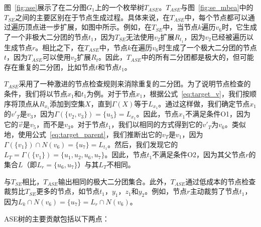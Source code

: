 \begin{example}
  图~\ref{fig:ase}展示了在二分图$G_1$上的一个枚举树$T_{ASE}$。$T_{ASE}$与图~\ref{fig:se_mbea}中的$T_{SE}$之间的主要区别在于节点生成过程。具体来说，在$T_{ASE}$中，每个节点都可以通过遍历顶点进一步扩展，如图中所示。例如，在$T_{SE}$中，当节点$k$遍历$v_6$时，它生成了一个非极大二分团的节点$t_1$，因为$T_{SE}$无法使用$v_2$扩展$R_{t_1}$，因为$v_2$已经被遍历以生成节点$r$。相比之下，在$T_{ASE}$中，节点$k$在遍历$v_6$时生成了一个极大二分团的节点$t$，因为$T_{ASE}$可以使用$v_2$扩展$R_{t}$。因此，$T_{ASE}$中的所有二分团都是极大的，但可能存在重复的二分团，比如节点$t$和节点$t_1$。

  $T_{ASE}$采用了一种激进的节点检查规则来消除重复的二分团。为了说明节点检查的条件，我们将以节点$x_1$和$t_1$为例。对于节点$x_1$，根据公式~\ref{eq:target_v}，我们按顺序将顶点从$R_{x_1}$添加到空集$X$，直到$\Gamma(X)$等于$L_{x_1}$。通过这样做，我们确定节点$x_1$的$v'_T$是$v_3$，因为$\Gamma(\{v_2,v_3\}) = \{u_5\}=L_{x_1}$。因此，节点$x_1$不满足条件O1，因为它的$\vec{v}$是$v_5$，而不是$v_3$。对于节点$t_1$，我们以相同的方式得到它的$v'_T$为$v_6$。类似地，使用公式~\ref{eq:target_parent}，我们推断出它的$v_T$是$v_1$，因为$\Gamma(\{v_1\}) \cap N(v_6) = \{u_7\}=L_{t_1}$。然后，我们发现它的$L_T = \Gamma(\{v_1\}) = \{u_1, u_2, u_6, u_7\}$。因此，节点$t_1$不满足条件O2，因为其父节点$r$的集合$L$（即$L_r=\{u_6, u_7\}$）与其$L_T$不相同。
  
  与$T_{SE}$相比，$T_{ASE}$输出相同的极大二分团集合。此外，$T_{ASE}$通过低成本的节点检查裁剪比$T_{SE}$更多的节点，如节点$t_1$，$y_1$，$z_1$和$y_2$。例如，节点$r$主动裁剪了节点$t_1$，因为$L_k \cap N(v_6) = \{u_7\} = L_r \cap N(v_6)$。





\end{example}

ASE树的主要贡献包括以下两点：

